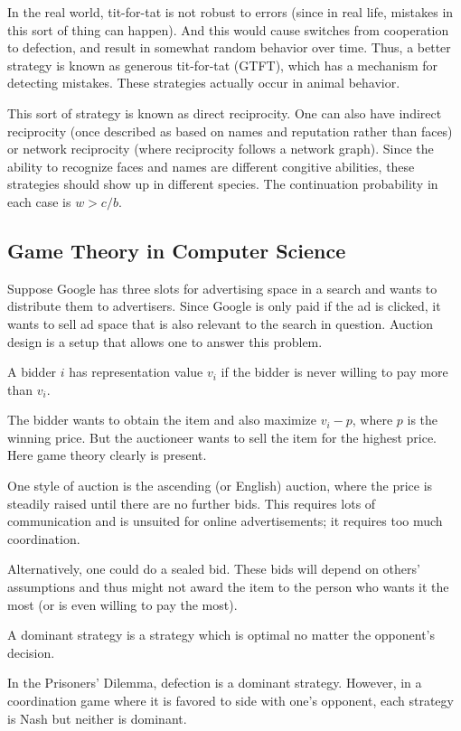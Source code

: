 In the real world, tit-for-tat is not robust to errors (since in real life, mistakes in this sort of thing can happen). And this would cause switches from cooperation to defection, and result in somewhat random behavior over time. Thus, a better strategy is known as generous tit-for-tat (GTFT), which has a mechanism for detecting mistakes. These strategies actually occur in animal behavior.

This sort of strategy is known as direct reciprocity. One can also have indirect reciprocity (once described as based on names and reputation rather than faces) or network reciprocity (where reciprocity follows a network graph). Since the ability to recognize faces and names are different congitive abilities, these strategies should show up in different species. The continuation probability in each case is $w > c/b$.

\subsection{Game Theory in Computer Science}
Suppose Google has three slots for advertising space in a search and wants to distribute them to advertisers. Since Google is only paid if the ad is clicked, it wants to sell ad space that is also relevant to the search in question. Auction design is a setup that allows one to answer this problem.

\begin{defn}
A bidder $i$ has representation value $v_i$ if the bidder is never willing to pay more than $v_i$.
\end{defn}
The bidder wants to obtain the item and also maximize $v_i - p$, where $p$ is the winning price. But the auctioneer wants to sell the item for the highest price. Here game theory clearly is present.

One style of auction is the ascending (or English) auction, where the price is steadily raised until there are no further bids. This requires lots of communication and is unsuited for online advertisements; it requires too much coordination.

Alternatively, one could do a sealed bid. These bids will depend on others' assumptions and thus might not award the item to the person who wants it the most (or is even willing to pay the most).

\begin{defn}
A dominant strategy is a strategy which is optimal no matter the opponent's decision.
\end{defn}
In the Prisoners' Dilemma, defection is a dominant strategy. However, in a coordination game where it is favored to side with one's opponent, each strategy is Nash but neither is dominant.

